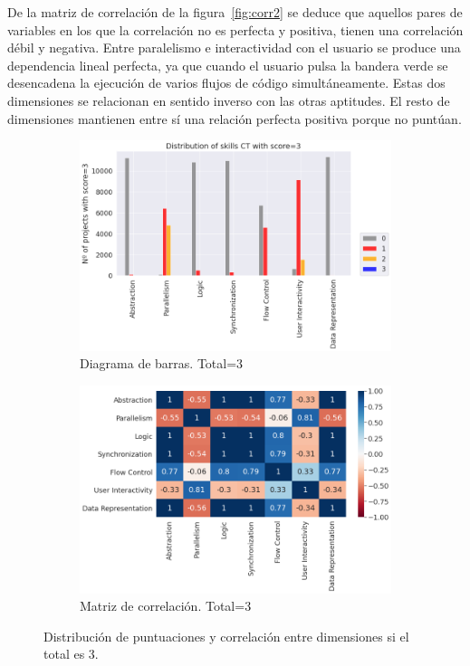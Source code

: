 \documentclass[a4paper, 12pt]{book}
\begin{document}
De la matriz de correlación de la figura~\ref{fig:corr2} se deduce que aquellos pares de variables en los que la correlación no es perfecta y positiva, tienen una correlación débil y negativa. Entre paralelismo e interactividad con el usuario se produce una dependencia lineal perfecta, ya que cuando el usuario pulsa la bandera verde se desencadena la ejecución de varios flujos de código simultáneamente. Estas dos dimensiones se relacionan en sentido inverso con las otras aptitudes. El resto de dimensiones mantienen entre sí una relación perfecta positiva porque no puntúan. 

\begin{figure}[H]
    \centering
    \begin{subfigure}[h]{.49\textwidth} 
        \includegraphics[width=\textwidth]{img/distribucion_3_Scratch}
        \caption{Diagrama de barras. Total=3}
        \label{fig:total3}
    \end{subfigure}       
    \begin{subfigure}[h]{.49\textwidth} 
        \includegraphics[width=\textwidth]{img/corr_3_Scratch}
        \caption{Matriz de correlación. Total=3}
        \label{fig:corr3}
    \end{subfigure}
     \caption{Distribución de puntuaciones y correlación entre dimensiones si el total es 3.}
\end{figure}
\end{document}
